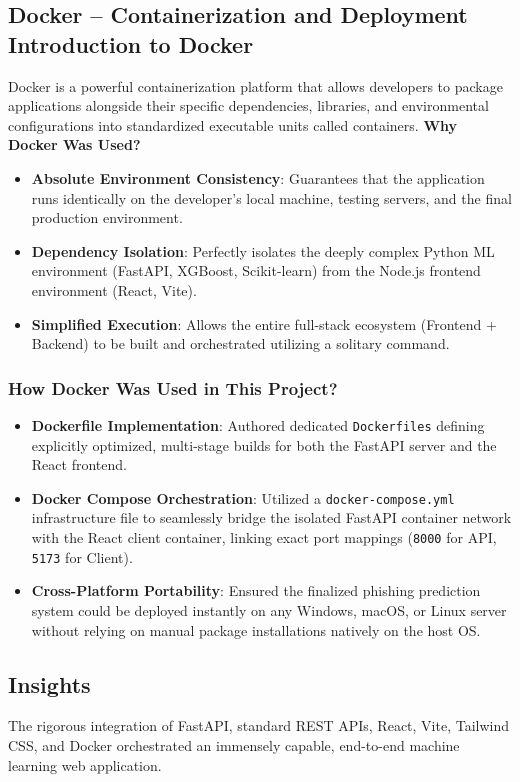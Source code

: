 \subsection{Docker -- Containerization and Deployment Introduction to Docker}
\noindent
Docker is a powerful containerization platform \cite{ref14} that allows developers to package applications alongside their specific dependencies, libraries, and environmental configurations into standardized executable units called containers.
\noindent
\textbf{Why Docker Was Used?}

\begin{itemize}
\item \textbf{Absolute Environment Consistency}: Guarantees that the application runs identically on the developer's local machine, testing servers, and the final production environment.
\item \textbf{Dependency Isolation}: Perfectly isolates the deeply complex Python ML environment (FastAPI, XGBoost, Scikit-learn) from the Node.js frontend environment (React, Vite).
\item \textbf{Simplified Execution}: Allows the entire full-stack ecosystem (Frontend + Backend) to be built and orchestrated utilizing a solitary command.
\end{itemize}

\subsubsection*{How Docker Was Used in This Project?}

\begin{itemize}
\item \textbf{Dockerfile Implementation}: Authored dedicated \texttt{Dockerfiles} defining explicitly optimized, multi-stage builds for both the FastAPI server and the React frontend.
\item \textbf{Docker Compose Orchestration}: Utilized a \texttt{docker-compose.yml} infrastructure file to seamlessly bridge the isolated FastAPI container network with the React client container, linking exact port mappings (\texttt{8000} for API, \texttt{5173} for Client).
\item \textbf{Cross-Platform Portability}: Ensured the finalized phishing prediction system could be deployed instantly on any Windows, macOS, or Linux server without relying on manual package installations natively on the host OS.
\end{itemize}

\subsection*{Insights}
\noindent
The rigorous integration of FastAPI, standard REST APIs, React, Vite, Tailwind CSS, and Docker orchestrated an immensely capable, end-to-end machine learning web application.

